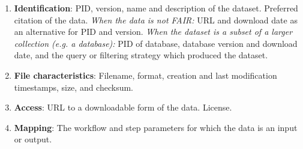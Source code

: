 \begin{enumerate}[label=\textbf{D\arabic*}]
    \item \textbf{Identification}: PID, version, name and description of the dataset. Preferred citation of the data. \emph{When the data is not FAIR:} URL and download date as an alternative for PID and version. \emph{When the dataset is a subset of a larger collection (e.g. a database):} PID of database, database version and download date, and the query or filtering strategy which produced the dataset. \label{req:data_id}
    \item \textbf{File characteristics}: Filename, format, creation and last modification timestamps, size, and checksum. \label{req:data_char}
    \item \textbf{Access}: URL to a downloadable form of the data. License. \label{req:data_access}
    \item \label{req:data_mapping} \textbf{Mapping}: The workflow and step parameters for which the data is an input or output.
\end{enumerate}